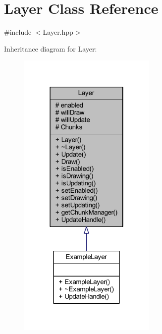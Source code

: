 \hypertarget{class_layer}{\section{Layer Class Reference}
\label{class_layer}
}


{\ttfamily \#include $<$Layer.\-hpp$>$}



Inheritance diagram for Layer\-:\nopagebreak
\begin{figure}[H]
\begin{center}
\leavevmode
\includegraphics[width=190pt]{class_layer__inherit__graph}
\end{center}
\end{figure}


